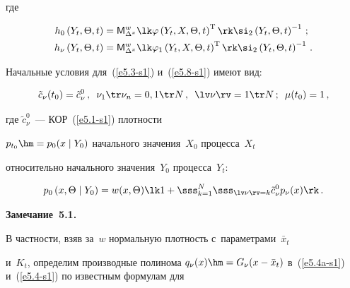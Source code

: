 где

\begin{align*}

h_0 \left(Y_t,\Theta,t\right) &= {\sf M}_{\Delta^x}^{w} \lk

\varphi\left(Y_t,X,\Theta,t\right)^{\mathrm{T}}\rk \si_2\left(Y_t,\Theta,t\right)^{-1}\,; %

\\

h_\nu \left(Y_t,\Theta,t\right) &= {\sf M}_{\Delta^x}^{w}\lk 

\varphi_1\left(Y_t,X,\Theta,t\right)^{\mathrm{T}}\rk \si_2\left(Y_t,\Theta,t\right)^{-1}\,. %

\end{align*}



Начальные условия для~(\ref{e5.3-s1}) и~(\ref{e5.8-s1}) имеют вид:

    \begin{equation}

    \tilde c_\nu (t_0)= \tilde c_\nu^0\,,\enskip \nu_1\tr \nu_n= 0,1\tr N\,, \enskip 

    \lv \nu\rv =

    1\tr N\,;\enskip \mu(t_0) =1\,,\label{e5.11-s1}

    \end{equation}

где  $\tilde c_\nu^0$~--- КОР~(\ref{e5.1-s1}) плотности

$p_{t_0} \hm= p_0 (x\mid Y_0)$ начального значения~$X_0$ процесса~$X_t$ 

относительно начального значения~$Y_0$ процесса~$Y_t$:

\begin{equation}

p_0\left(x, \Theta\mid Y_0\right) = w(x,\Theta) \lk 1+ 

\sss_{k=1}^N \sss_{\lv\nu\rv =k}\tilde c_\nu^0 p_\nu(x)\rk\,.\label{e5.12-s1}

\end{equation}



\noindent

\textbf{Замечание~5.1.}\

В частности, взяв за~$w$ нормальную плотность с~параметрами~$\bar x_t$ 

и~$K_t$, определим производные полинома $q_\nu (x) \hm=

G_\nu (x-\bar x_t)$ в~(\ref{e5.4a-s1}) и~(\ref{e5.4-s1}) по известным формулам для

